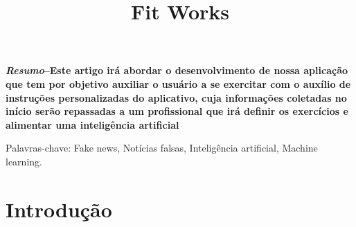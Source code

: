 \documentclass[conference]{IEEEtran}
\begin{document}
\title{Fit Works}

\author{

\and
{}

\and
{}

}

\maketitle


\begin{resumo}
\textbf{{\textit{Resumo}}--Este artigo irá abordar o desenvolvimento de nossa aplicação que tem por objetivo auxiliar o usuário a se exercitar com o auxílio de instruções personalizadas do aplicativo, cuja informações coletadas no início serão repassadas a um profissional que irá definir os exercícios e alimentar uma inteligência artificial }
\end{resumo}


\begin{IEEEkeywords}
Palavras-chave: Fake news, Notícias falsas, Inteligência artificial, Machine learning.
\end{IEEEkeywords}

\section{Introdução}
\end{document}
